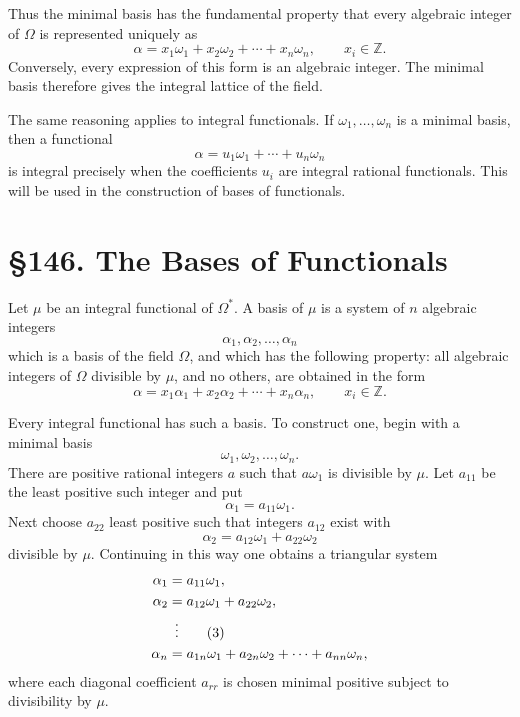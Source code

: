 \documentclass[11pt,a4paper]{book}
\newcommand{\webersection}[2]{\clearpage\section*{\S #1. #2}}
\begin{document}
Thus the minimal basis has the fundamental property that every algebraic integer of \(\Omega\) is represented uniquely as
\begin{equation}
 \alpha=x_1\omega_1+x_2\omega_2+
\cdots+x_n\omega_n,
\qquad x_i\in\mathbb Z. \tag{1}
\end{equation}
Conversely, every expression of this form is an algebraic integer.  The minimal basis therefore gives the integral lattice of the field.

The same reasoning applies to integral functionals.  If \(\omega_1,
\ldots,
\omega_n\) is a minimal basis, then a functional
\[
 \alpha=u_1\omega_1+
\cdots+u_n\omega_n
\]
is integral precisely when the coefficients \(u_i\) are integral rational functionals.  This will be used in the construction of bases of functionals.

\webersection{146}{The Bases of Functionals}

Let \(\mu\) be an integral functional of \(\Omega^*\).  A basis of \(\mu\) is a system of \(n\) algebraic integers
\begin{equation}
 \alpha_1,
\alpha_2,
\ldots,
\alpha_n \tag{1}
\end{equation}
which is a basis of the field \(\Omega\), and which has the following property: all algebraic integers of \(\Omega\) divisible by \(\mu\), and no others, are obtained in the form
\begin{equation}
 \alpha=x_1\alpha_1+x_2\alpha_2+
\cdots+x_n\alpha_n,
\qquad x_i\in\mathbb Z. \tag{2}
\end{equation}

Every integral functional has such a basis.  To construct one, begin with a minimal basis
\[
 \omega_1,
\omega_2,
\ldots,
\omega_n.
\]
There are positive rational integers \(a\) such that \(a\omega_1\) is divisible by \(\mu\).  Let \(a_{11}\) be the least positive such integer and put
\[
 \alpha_1=a_{11}\omega_1.
\]
Next choose \(a_{22}\) least positive such that integers \(a_{12}\) exist with
\[
 \alpha_2=a_{12}\omega_1+a_{22}\omega_2
\]
divisible by \(\mu\).  Continuing in this way one obtains a triangular system
\begin{align}
 \alpha_1&=a_{11}\omega_1,\notag\\
 \alpha_2&=a_{12}\omega_1+a_{22}\omega_2,\notag\\
 &\ \,\vdots \tag{3}\\
 \alpha_n&=a_{1n}\omega_1+a_{2n}\omega_2+
\cdots+a_{nn}\omega_n,
\notag
\end{align}
where each diagonal coefficient \(a_{rr}\) is chosen minimal positive subject to divisibility by \(\mu\).
\end{document}
